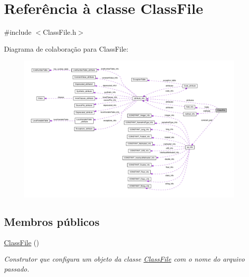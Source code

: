 \hypertarget{classClassFile}{}\section{Referência à classe Class\+File}
\label{classClassFile}


{\ttfamily \#include $<$Class\+File.\+h$>$}



Diagrama de colaboração para Class\+File\+:
\nopagebreak
\begin{figure}[H]
\begin{center}
\leavevmode
\includegraphics[width=350pt]{classClassFile__coll__graph}
\end{center}
\end{figure}
\subsection*{Membros públicos}
\begin{DoxyCompactItemize}
\item 
\hyperlink{classClassFile_a47669d90346c9fa0db30ae582c74a199}{Class\+File} ()
\begin{DoxyCompactList}\small\item\em Construtor que configura um objeto da classe \hyperlink{classClassFile}{Class\+File} com o nome do arquivo passado. \end{DoxyCompactList}\end{DoxyCompactItemize}
